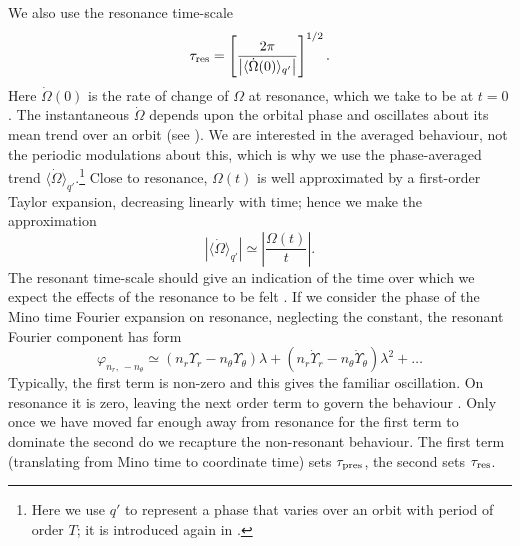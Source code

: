 We also use the resonance time-scale
\begin{equation}
\tau_\mathrm{res} = \left[\dfrac{2\pi}{\left|\langle\dot{\Omega}(0)\rangle_{q'}\right|}\right]^{1/2}.
\label{eq:t-res}
\end{equation}
Here $\dot{\Omega}(0)$ is the rate of change of $\Omega$ at resonance, which we take to be at $t = 0$. The instantaneous $\dot{\Omega}$ depends upon the orbital phase and oscillates about its mean trend over an orbit (see ). We are interested in the averaged behaviour, not the periodic modulations about this, which is why we use the phase-averaged trend $\langle\dot{\Omega}\rangle_{q'}$.\footnote{Here we use $q'$ to represent a phase that varies over an orbit with period of order $T$; it is introduced again in .} Close to resonance, $\Omega(t)$ is well approximated by a first-order Taylor expansion, decreasing linearly with time; hence we make the approximation
\begin{equation}
\left|\langle\dot{\Omega}\rangle_{q'}\right| \simeq \left|\dfrac{\Omega(t)}{t}\right|.
\end{equation}
The resonant time-scale should give an indication of the time over which we expect the effects of the resonance to be felt \citep{Bosley1992}. If we consider the phase of the Mino time Fourier expansion on resonance, neglecting the constant, the resonant Fourier component has form
\begin{equation}
\varphi_{n_r,\,-n_\theta} \simeq \left(n_r\Upsilon_r - n_\theta\Upsilon_\theta\right)\lambda + \left(n_r\dot{\Upsilon}_r - n_\theta\dot{\Upsilon}_\theta\right)\lambda^2 + \ldots
\end{equation}
Typically, the first term is non-zero and this gives the familiar oscillation. On resonance it is zero, leaving the next order term to govern the behaviour \citep{Flanagan2012}. Only once we have moved far enough away from resonance for the first term to dominate the second do we recapture the non-resonant behaviour. The first term (translating from Mino time to coordinate time) sets $\tau_\mathrm{pres}$, the second sets $\tau_\mathrm{res}$.

